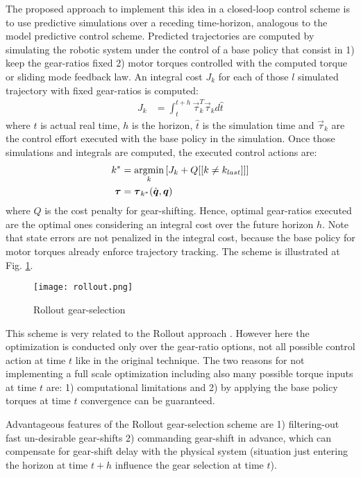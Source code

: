 The proposed approach to implement this idea in a closed-loop control scheme is to use predictive simulations over a receding time-horizon, analogous to the model predictive control scheme. Predicted trajectories are computed by simulating the robotic system under the control of a base policy that consist in 1) keep the gear-ratios fixed 2) motor torques controlled with the computed torque or sliding mode feedback law. An integral cost $J_k$ for each of those $l$ simulated trajectory with fixed gear-ratios is computed:
%
\begin{align}
J_k &= \int_t^{t+h} \vec{\tau}_k^T \vec{\tau}_k d\hat{t}
\end{align}
%
where $t$ is actual real time, $h$ is the horizon, $\hat{t}$ is the simulation time and $\vec{\tau}_k$ are the control effort executed with the base policy in the simulation. Once those simulations and integrals are computed, the executed control actions are:
%
\begin{align}
k^{*}      &= \operatornamewithlimits{argmin}\limits_{k} \left[ J_k + Q [[ k \neq k_{last}]] \right] \\
\vec{\tau} &= \vec{\tau}_{k^*}( \dot{\vec{q}} , \vec{q} )
\end{align}
%
where $Q$ is the cost penalty for gear-shifting. Hence, optimal gear-ratios executed are the optimal ones considering an integral cost over the future horizon $h$. Note that state errors are not penalized in the integral cost, because the base policy for motor torques already enforce trajectory tracking. The scheme is illustrated at Fig. \ref{fig:rollout}.
%
\begin{figure}[htp]
	\centering
		\texttt{[image: rollout.png]}
	\caption[Rollout gear-selection]{Rollout gear-selection}
	\label{fig:rollout}
\end{figure}
%
This scheme is very related to the Rollout approach \cite{bertsekas_dynamic_2000}. However here the optimization is conducted only over the gear-ratio options, not all possible control action at time $t$ like in the original technique. The two reasons for not implementing a full scale optimization including also many possible torque inputs at time $t$ are: 1) computational limitations and 2) by applying the base policy torques at time $t$ convergence can be guaranteed. 

Advantageous features of the Rollout gear-selection scheme are 1) filtering-out fast un-desirable gear-shifts 2) commanding gear-shift in advance, which can compensate for gear-shift delay with the physical system (situation just entering the horizon at time $t+h$ influence the gear selection at time $t$).

